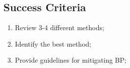 \subsection{Success Criteria}
\begin{enumerate}
    \item Review 3-4 different methods;
    \item Identify the best method;
    \item Provide guidelines for mitigating BP;
\end{enumerate}

